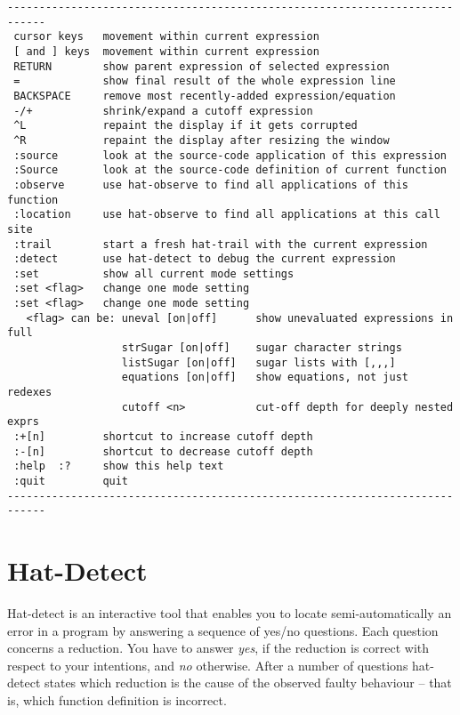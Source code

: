 \documentclass[12pt]{article}
\begin{document}
\begin{verbatim}
----------------------------------------------------------------------------
 cursor keys   movement within current expression
 [ and ] keys  movement within current expression
 RETURN        show parent expression of selected expression
 =             show final result of the whole expression line
 BACKSPACE     remove most recently-added expression/equation
 -/+           shrink/expand a cutoff expression
 ^L            repaint the display if it gets corrupted
 ^R            repaint the display after resizing the window
 :source       look at the source-code application of this expression
 :Source       look at the source-code definition of current function
 :observe      use hat-observe to find all applications of this function
 :location     use hat-observe to find all applications at this call site
 :trail        start a fresh hat-trail with the current expression
 :detect       use hat-detect to debug the current expression
 :set          show all current mode settings
 :set <flag>   change one mode setting
 :set <flag>   change one mode setting
   <flag> can be: uneval [on|off]      show unevaluated expressions in full
                  strSugar [on|off]    sugar character strings
                  listSugar [on|off]   sugar lists with [,,,] 
                  equations [on|off]   show equations, not just redexes
                  cutoff <n>           cut-off depth for deeply nested exprs
 :+[n]         shortcut to increase cutoff depth
 :-[n]         shortcut to decrease cutoff depth
 :help  :?     show this help text
 :quit         quit
----------------------------------------------------------------------------
\end{verbatim}



\section{Hat-Detect}\label{hat-detect}

Hat-detect is an interactive tool that enables you to locate
semi-automatically an error in a program by answering a sequence
of yes/no questions.  Each question concerns a reduction.  You have
to answer \emph{yes}, if the reduction is correct with respect to
your intentions, and \emph{no} otherwise.  After a number of questions
hat-detect states which reduction is the cause of the observed faulty
behaviour -- that is, which function definition is incorrect.
\end{document}
